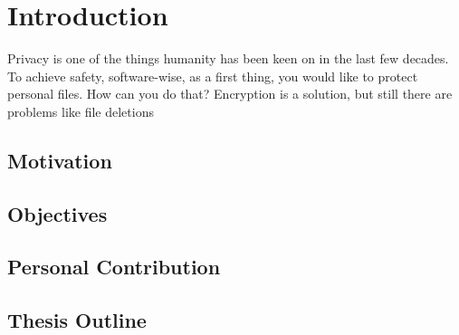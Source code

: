\chapter{Introduction}
	Privacy is one of the things humanity has been keen on in the last few decades. To achieve safety, software-wise, as a first thing, you would like to protect personal files. How can you do that? Encryption is a solution, but still there are problems like file deletions
	
	\section{Motivation}
	
	\section{Objectives}
	
	\section{Personal Contribution}
	
	\section{Thesis Outline}